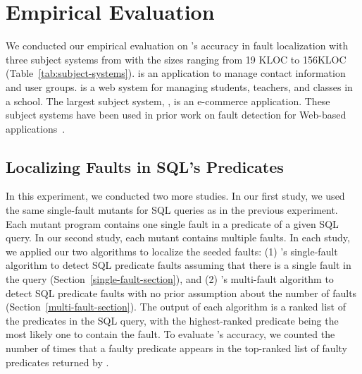 \section{Empirical Evaluation}


We conducted our empirical evaluation on {\tool}'s accuracy in fault
localization with three subject systems from 
with the sizes ranging from 19 KLOC to 156KLOC
(Table~\ref{tab:subject-systems}).   is an
application to manage contact information and user
groups.  is a web system for managing students,
teachers, and classes in a school. The largest subject system,
, is an e-commerce application. These subject systems
have been used in prior work on fault detection for Web-based
applications~\cite{icsm13,apollo10}.






\subsection{Localizing Faults in SQL's Predicates}




In this experiment, we conducted two more studies. In our first study,
we used the same single-fault mutants for SQL queries as in the
previous experiment.  Each mutant program contains one single fault in
a predicate of a given SQL query. In our second study, each mutant
contains multiple faults.  In each study, we applied our two
algorithms to localize the seeded faults: (1) \tool{}'s single-fault
algorithm to detect SQL predicate faults assuming that there is a
single fault in the query (Section~\ref{single-fault-section}), and
(2) \tool{}'s multi-fault algorithm to detect SQL predicate faults
with no prior assumption about the number of faults
(Section~\ref{multi-fault-section}). The output of each algorithm is a
ranked list of the predicates in the SQL query, with the
highest-ranked predicate being the most likely one to contain the
fault. To evaluate {\tool}'s accuracy, we counted the number of times
that a faulty predicate appears in the top-ranked list of faulty
predicates returned by {\tool}.

